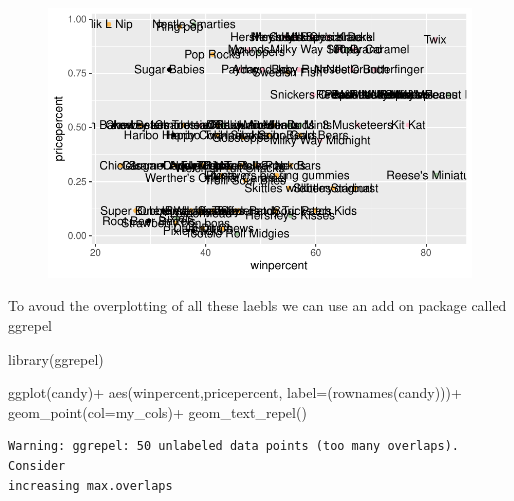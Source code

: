 \documentclass[
  letterpaper,
  DIV=11,
  numbers=noendperiod]{scrartcl}
\newenvironment{Shaded}{\begin{snugshade}}{\end{snugshade}}
\newcommand{\AttributeTok}[1]{\textcolor[rgb]{0.40,0.45,0.13}{#1}}
\newcommand{\FunctionTok}[1]{\textcolor[rgb]{0.28,0.35,0.67}{#1}}
\newcommand{\NormalTok}[1]{\textcolor[rgb]{0.00,0.23,0.31}{#1}}
\newcommand{\SpecialCharTok}[1]{\textcolor[rgb]{0.37,0.37,0.37}{#1}}
\begin{document}
\begin{figure}[H]

{\centering \includegraphics{class09_files/figure-pdf/unnamed-chunk-22-1.pdf}

}

\end{figure}

To avoud the overplotting of all these laebls we can use an add on
package called ggrepel

\begin{Shaded}
\begin{Highlighting}[]
\FunctionTok{library}\NormalTok{(ggrepel)}

\FunctionTok{ggplot}\NormalTok{(candy)}\SpecialCharTok{+}
  \FunctionTok{aes}\NormalTok{(winpercent,pricepercent, }\AttributeTok{label=}\NormalTok{(}\FunctionTok{rownames}\NormalTok{(candy)))}\SpecialCharTok{+}
  \FunctionTok{geom\_point}\NormalTok{(}\AttributeTok{col=}\NormalTok{my\_cols)}\SpecialCharTok{+}
  \FunctionTok{geom\_text\_repel}\NormalTok{()}
\end{Highlighting}
\end{Shaded}

\begin{verbatim}
Warning: ggrepel: 50 unlabeled data points (too many overlaps). Consider
increasing max.overlaps
\end{verbatim}
\end{document}
